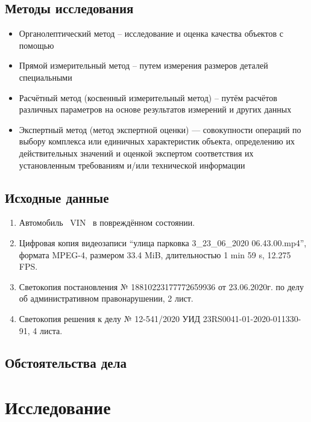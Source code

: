 \subsection{Методы исследования}
\begin{itemize}
\item  Органолептический метод – исследование и оценка качества объектов с помощью %
\item 	Прямой измерительный метод – путем измерения размеров деталей специальными %
\item Расчётный метод (косвенный измерительный метод) – путём расчётов различных параметров на основе результатов измерений и других данных
\item Экспертный метод (метод экспертной оценки) — совокупности операций по выбору комплекса или единичных характеристик объекта, определению их действительных значений и оценкой экспертом соответствия их установленным требованиям и/или технической информации
\end{itemize}


\subsection{Исходные данные}

\begin{enumerate}
	
	\item Автомобиль  \, VIN \vin \, в повреждённом состоянии.
	\item Цифровая копия видеозаписи \enquote{улица парковка 3\_23\_06\_2020 06.43.00.mp4}, формата  MPEG-4,  размером 33.4 MiB, длительностью 1 min 59 s, 12.275 FPS.
	\item Светокопия постановления № 18810223177772659936 от 23.06.2020г. по делу об административном правонарушении, 2 лист.
	\item Светокопия  решения к делу № 12-541/2020 УИД 23RS0041-01-2020-011330-91, 4 листа.
%	
%	
\end{enumerate}

\subsection{Обстоятельства дела}
%
 
%
%
\section{Исследование}
%

